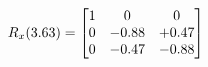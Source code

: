 \documentclass[preview]{standalone}
\begin{document}
\begin{align*}
\special{dvisvgm:raw <g id='unique000'>}R_{x}(3.63) = \begin{bmatrix}1 & 0 & 0 \\0 & -0.88 & +0.47 \\0 & -0.47 & -0.88\end{bmatrix}\special{dvisvgm:raw </g>}
\end{align*}
\end{document}
